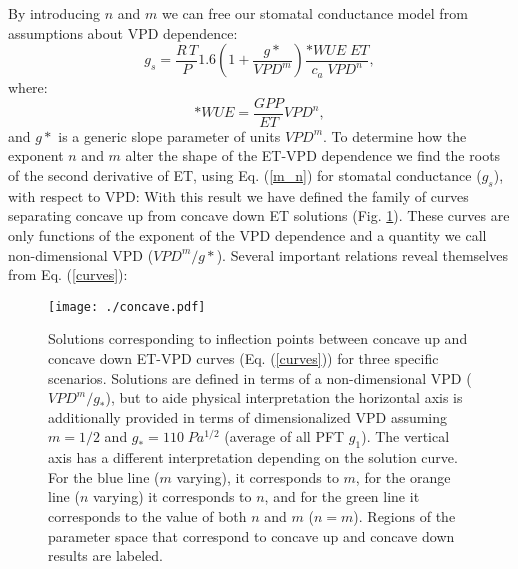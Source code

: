 By introducing $n$ and $m$ we can free our stomatal
conductance model from assumptions about VPD dependence:
  \begin{equation}
    g_s = \frac{R \, T}{P} 1.6 \left(1 + \frac{g*}{VPD^m}\right) \frac{*WUE \; ET}{c_a \; VPD^n},
    \label{m_n}
  \end{equation}
where:
\[*WUE = \frac{GPP}{ET}VPD^n,\] and $g*$ is a generic slope parameter
of units $VPD^m$. To determine how the exponent $n$ and $m$ alter the
shape of the ET-VPD dependence we find the roots of the second
derivative of ET, using Eq. (\ref{m_n}) for stomatal conductance
($g_s$), with respect to VPD:  With this
result we have defined the family of curves separating concave up from
concave down ET solutions (Fig. \ref{concave}). These curves are
only functions of the exponent of the VPD dependence and a quantity we
call non-dimensional VPD ($VPD^m/g*$). Several important
relations reveal themselves from Eq. (\ref{curves}):

\begin{figure}
  \centering
  \centerline{\texttt{[image: ./concave.pdf]}}
  \caption{ Solutions corresponding to inflection points between
    concave up and concave down ET-VPD curves (Eq. (\ref{curves}))
    for three specific scenarios. Solutions are defined in terms of a
    non-dimensional VPD ($VPD^m/g_*$), but to aide physical
    interpretation the horizontal axis is additionally provided in terms of dimensionalized VPD assuming $m=1/2$ and
    $g_*=110\; Pa^{1/2}$ (average of all PFT $g_1$). The vertical axis
    has a different interpretation depending on the solution
    curve. For the blue line ($m$ varying), it corresponds to $m$,
    for the orange line ($n$ varying) it corresponds to $n$, and for
    the green line it corresponds to the value of both $n$ and $m$
    ($n=m$). Regions of the parameter space that correspond to
    concave up and concave down results are labeled.}
  \label{concave}
\end{figure}

